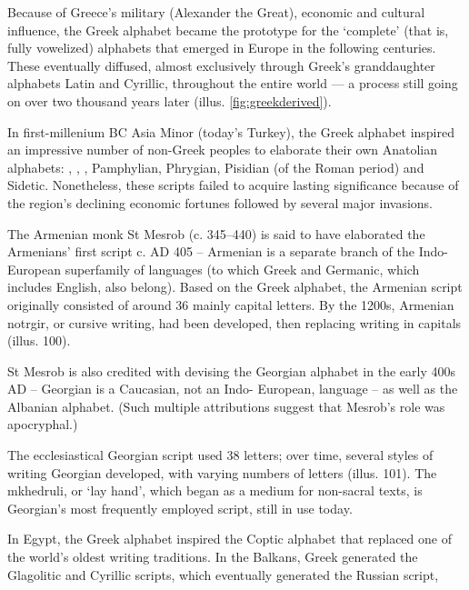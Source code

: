Because of Greece’s military (Alexander the Great), economic
and cultural influence, the Greek alphabet became the
prototype for the ‘complete’ (that is, fully vowelized) alphabets
that emerged in Europe in the following centuries. These eventually
diffused, almost exclusively through Greek’s granddaughter
alphabets Latin and Cyrillic, throughout the entire
world --- a process still going on over two thousand years later
(illus. \ref{fig:greekderived}).

In first-millenium BC Asia Minor (today’s Turkey), the
Greek alphabet inspired an impressive number of non-Greek
peoples to elaborate their own Anatolian alphabets: ,
, , Pamphylian, Phrygian, Pisidian (of the Roman
period) and Sidetic.  Nonetheless, these scripts failed to
acquire lasting significance because of the region’s declining
economic fortunes followed by several major invasions.



The Armenian monk St Mesrob (c. 345–440) is said to have
elaborated the Armenians’ first script c. AD 405 – Armenian is a
separate branch of the Indo-European superfamily of languages
(to which Greek and Germanic, which includes English, also
belong). Based on the Greek alphabet, the Armenian script
originally consisted of around 36 mainly capital letters. By the
1200s, Armenian notrgir, or cursive writing, had been developed,
then replacing writing in capitals (illus. 100).

St Mesrob is also credited with devising the Georgian alphabet
in the early 400s AD – Georgian is a Caucasian, not an Indo-
European, language – as well as the Albanian alphabet. (Such
multiple attributions suggest that Mesrob’s role was apocryphal.)

The ecclesiastical Georgian script used 38 letters; over
time, several styles of writing Georgian developed, with varying
numbers of letters (illus. 101). The mkhedruli, or ‘lay hand’,
which began as a medium for non-sacral texts, is Georgian’s
most frequently employed script, still in use today.

In Egypt, the Greek alphabet inspired the Coptic
alphabet that replaced one of the world’s oldest writing traditions.
In the Balkans, Greek generated the Glagolitic and
Cyrillic scripts, which eventually generated the Russian script,







